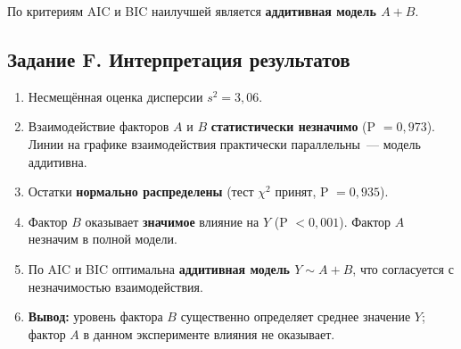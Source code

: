 \documentclass[12pt,a4paper]{article}
\begin{document}
По критериям AIC и BIC наилучшей является \textbf{аддитивная модель $A + B$}.

\subsection{Задание F. Интерпретация результатов}

\begin{enumerate}
  \item Несмещённая оценка дисперсии $s^2 = 3{,}06$.
  \item Взаимодействие факторов $A$ и $B$ \textbf{статистически незначимо} (P $= 0{,}973$). Линии на графике взаимодействия практически параллельны~--- модель аддитивна.
  \item Остатки \textbf{нормально распределены} (тест $\chi^2$ принят, P $= 0{,}935$).
  \item Фактор $B$ оказывает \textbf{значимое} влияние на $Y$ (P $< 0{,}001$). Фактор $A$ незначим в полной модели.
  \item По AIC и BIC оптимальна \textbf{аддитивная модель $Y \sim A + B$}, что согласуется с незначимостью взаимодействия.
  \item \textbf{Вывод:} уровень фактора $B$ существенно определяет среднее значение $Y$; фактор $A$ в данном эксперименте влияния не оказывает.
\end{enumerate}
\end{document}
